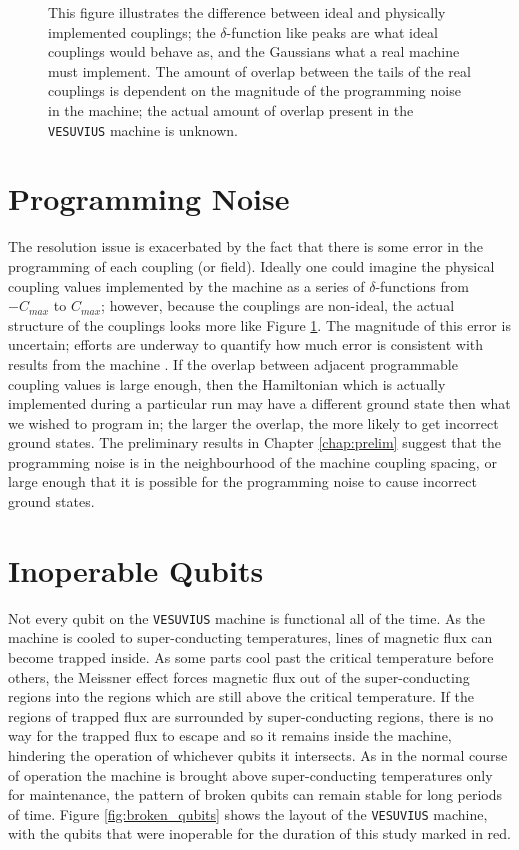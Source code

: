 \begin{figure}
	\caption[Ideal vs. Physical Couplings]{This figure illustrates the difference between ideal and physically implemented couplings; the $\delta$-function like peaks are what ideal couplings would behave as, and the Gaussians what a real machine must implement.  The amount of overlap between the tails of the real couplings is dependent on the magnitude of the programming noise in the machine; the actual amount of overlap present in the \texttt{VESUVIUS} machine is unknown.}
	\label{fig:coupling_spread}
\end{figure}

\section{Programming Noise}
\label{sec:noise}
The resolution issue is exacerbated by the fact that there is some error in the programming of each coupling (or field).  Ideally one could imagine the physical coupling values implemented by the machine as a series of $\delta$-functions from $-C_{max}$ to $C_{max}$; however, because the couplings are non-ideal, the actual structure of the couplings looks more like Figure \ref{fig:coupling_spread}.  The magnitude of this error is uncertain; efforts are underway to quantify how much error is consistent with results from the machine \cite{aaron}.  If the overlap between adjacent programmable coupling values is large enough, then the Hamiltonian which is actually implemented during a particular run may have a different ground state then what we wished to program in; the larger the overlap, the more likely to get incorrect ground states.  The preliminary results in Chapter \ref{chap:prelim} suggest that the programming noise is in the neighbourhood of the machine coupling spacing, or large enough that it is possible for the programming noise to cause incorrect ground states.

\section{Inoperable Qubits}
Not every qubit on the \texttt{VESUVIUS} machine is functional all of the time.  As the machine is cooled to super-conducting temperatures, lines of magnetic flux can become trapped inside.  As some parts cool past the critical temperature before others, the Meissner effect forces magnetic flux out of the super-conducting regions into the regions which are still above the critical temperature.  If the regions of trapped flux are surrounded by super-conducting regions, there is no way for the trapped flux to escape and so it remains inside the machine, hindering the operation of whichever qubits it intersects.  As in the normal course of operation the machine is brought above super-conducting temperatures only for maintenance, the pattern of broken qubits can remain stable for long periods of time.  Figure \ref{fig:broken_qubits} shows the layout of the \texttt{VESUVIUS} machine, with the qubits that were inoperable for the duration of this study marked in red.

